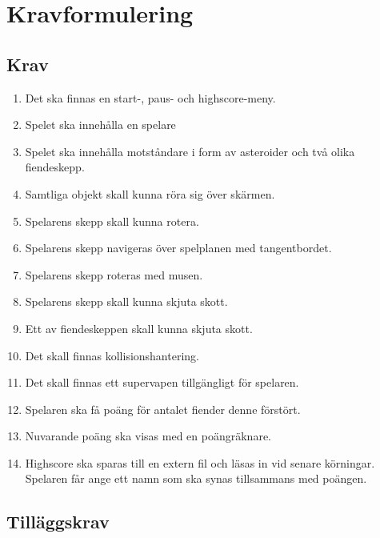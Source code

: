 \documentclass{TDP003mall}
\begin{document}
\newpage

\section{Kravformulering}

\subsection{Krav}
\begin{enumerate}

\item{Det ska finnas en start-, paus- och highscore-meny.}
\item{Spelet ska innehålla en spelare}
\item{Spelet ska innehålla  motståndare i form av asteroider och två olika fiendeskepp.}
\item{Samtliga objekt skall kunna röra sig över skärmen.}
\item{Spelarens skepp skall kunna rotera.}

\item{Spelarens skepp navigeras över spelplanen med tangentbordet.}
\item{Spelarens skepp roteras med musen.}
\item{Spelarens skepp skall kunna skjuta skott.}
\item{Ett av fiendeskeppen skall kunna skjuta skott.}
\item{Det skall finnas kollisionshantering.}

\item{Det skall finnas ett supervapen tillgängligt för spelaren.}
\item{Spelaren ska få poäng för antalet fiender denne förstört.}
\item{Nuvarande poäng ska visas med en poängräknare.}
\item{Highscore ska sparas till en extern fil och läsas in vid senare körningar. Spelaren får ange ett namn
som ska synas tillsammans med poängen.}


\end{enumerate}

\subsection{Tilläggskrav}
\end{document}
